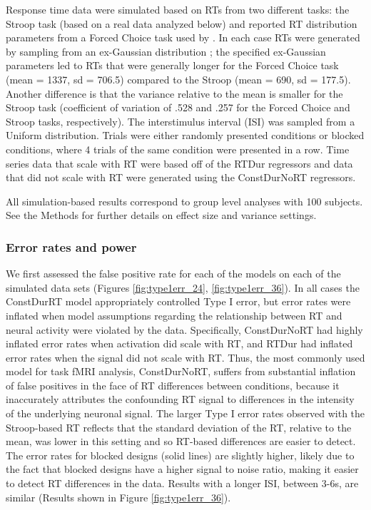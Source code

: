 \documentclass[titlepage,12pt] {article}
\begin{document}
Response time data were simulated based on RTs from two different tasks: the Stroop task (based on a real data analyzed below) and reported RT distribution parameters from a Forced Choice task used by \citet{grinband_detection_2008}.  In each case RTs were generated by sampling from an ex-Gaussian distribution \citep{Ratcliff1976RetrievalPI}; the specified ex-Gaussian parameters led to RTs that were generally longer for the Forced Choice task (mean = 1337, sd = 706.5) compared to the Stroop (mean = 690, sd = 177.5).  Another difference is that the variance relative to the mean is smaller for the Stroop task (coefficient of variation of .528 and .257 for the Forced Choice and Stroop tasks, respectively).   The interstimulus interval (ISI) was sampled from a Uniform distribution. Trials were either randomly presented conditions or blocked conditions, where 4 trials of the same condition were presented in a row.  Time series data that scale with RT were based off of the RTDur regressors and data that did not scale with RT were generated using the ConstDurNoRT regressors. 

All simulation-based results correspond to group level analyses with 100 subjects.  See the Methods for further details on effect size and variance settings.


\subsubsection*{Error rates and power}
 
 We first assessed the false positive rate for each of the models on each of the simulated data sets (Figures \ref{fig:type1err_24}, \ref{fig:type1err_36}). In all cases the ConstDurRT model appropriately controlled Type I error, but error rates were inflated when model assumptions regarding the relationship between RT and neural activity were violated by the data.  Specifically, ConstDurNoRT had highly inflated error rates when activation did scale with RT, and RTDur had inflated error rates when the signal did not  scale with RT.  Thus, the most commonly used model for task fMRI analysis, ConstDurNoRT, suffers from substantial inflation of false positives in the face of RT differences between conditions, because it inaccurately attributes the confounding RT signal to differences in the intensity of the underlying neuronal signal.  The larger Type I error rates observed with the Stroop-based RT reflects that the standard deviation of the RT, relative to the mean, was lower in this setting and so RT-based differences are easier to detect. The error rates for blocked designs (solid lines) are slightly higher, likely due to the fact that blocked designs have a higher signal to noise ratio, making it easier to detect RT differences in the data.  Results with a longer ISI, between 3-6s, are similar (Results shown in Figure \ref{fig:type1err_36}).
\end{document}
